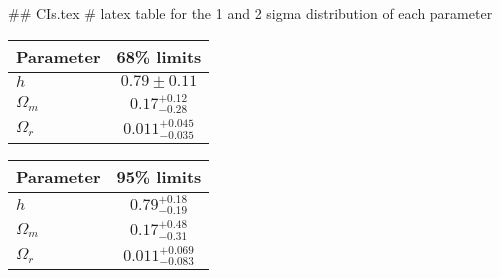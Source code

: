 ## CIs.tex
# latex table for the 1 and 2 sigma distribution of each parameter

\begin{tabular} { l  c}
 Parameter &  68\% limits\\
\hline
{\boldmath$h              $} & $0.79\pm 0.11              $\\
{\boldmath$\Omega_m       $} & $0.17^{+0.12}_{-0.28}      $\\
{\boldmath$\Omega_r       $} & $0.011^{+0.045}_{-0.035}   $\\
\hline
\end{tabular}

\begin{tabular} { l  c}
 Parameter &  95\% limits\\
\hline
{\boldmath$h              $} & $0.79^{+0.18}_{-0.19}      $\\
{\boldmath$\Omega_m       $} & $0.17^{+0.48}_{-0.31}      $\\
{\boldmath$\Omega_r       $} & $0.011^{+0.069}_{-0.083}   $\\
\hline
\end{tabular}
